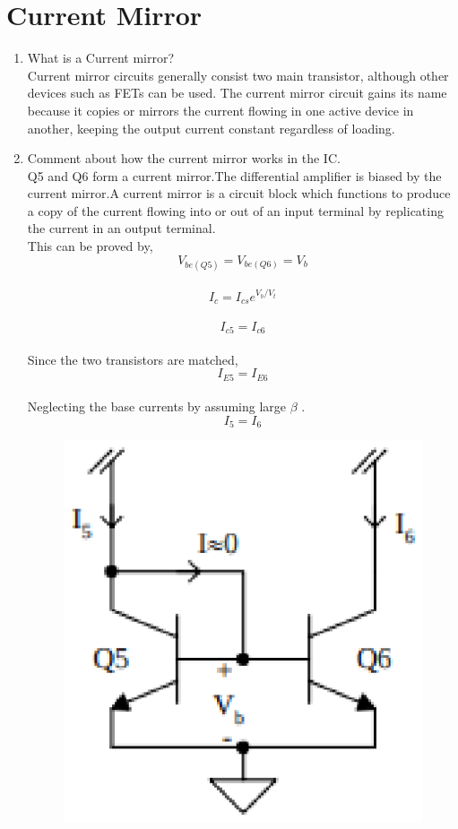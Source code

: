 \documentclass[journal,12pt,twocolumn]{IEEEtran}
\renewcommand\thesection{\arabic{section}}
\begin{document}
\section{Current Mirror}
\begin{enumerate}[label=\thesection.\arabic*,ref=\thesection.\theenumi]
\item What is a Current mirror?\\
\solution Current mirror circuits generally consist two main transistor, although other devices such as FETs can be used. The current mirror circuit gains its name because it copies or mirrors the current flowing in one active device in another, keeping the output current constant regardless of loading.
\item Comment about how the current mirror works in the IC.\\
\solution
Q5 and Q6 form a current mirror.The differential amplifier is biased by the current mirror.A current mirror is a circuit block which functions to produce a copy of the current flowing into or out of an input terminal by replicating the current in an output terminal.\\
This can be proved by,
\bigskip
\vspace{-1em}
$$V_{be(Q5)}=V_{be(Q6)}=V_b$$\\
\vspace{-1em}
$$I_c=I_{cs}e^{V_b/V_t}$$\\
\vspace{-1em}
$$I_{c5}=I_{c6}$$\\
\vspace{-0.5em}
Since the two transistors are matched,\\
\vspace{-1em}
$$I_{E5}=I_{E6}$$\\
\vspace{-0.5em}
Neglecting the base currents by assuming large $\beta$ .\\
\vspace{-1em}
$$I_5=I_6$$


 \begin{figure}[!ht]
\centering
\includegraphics[width=0.7\columnwidth]{./figs/LM3863.eps}
\caption{}
\label{fig:1}
\end{figure}

\end{enumerate}
\end{document}
